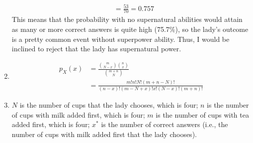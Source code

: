 \documentclass[12pt,letterpaper, onecolumn]{exam}
\begin{document}
\begin{questions}
\begin{solution}
\begin{enumerate}
\begin{align*}
                & = \frac{53}{70} = 0.757
            \end{align*}
            This means that the probability with no supernatural abilities would attain as many or more correct answers is quite high (75.7\%), so the lady's outcome is a pretty common event without superpower ability. Thus, I would be inclined to reject that the lady has supernatural power. \\
            \item \begin{align*}
                p_X(x) & = \frac{\binom{m}{N-x} \binom{n}{x}}{\binom{m+n}{N}} \\
                & = \frac{m!n!N!(m+n-N)!}{(n-x)!(m-N+x)!x!(N-x)!(m+n)!}
            \end{align*}
            \item $N$ is the number of cups that the lady chooses, which is four; $n$ is the number of cups with milk added first, which is four; $m$ is the number of cups with tea added first, which is four; $x^*$ is the number of correct answers (i.e., the number of cups with milk added first that the lady chooses).
        \end{enumerate}
    \end{solution}


\end{questions}
\end{document}
